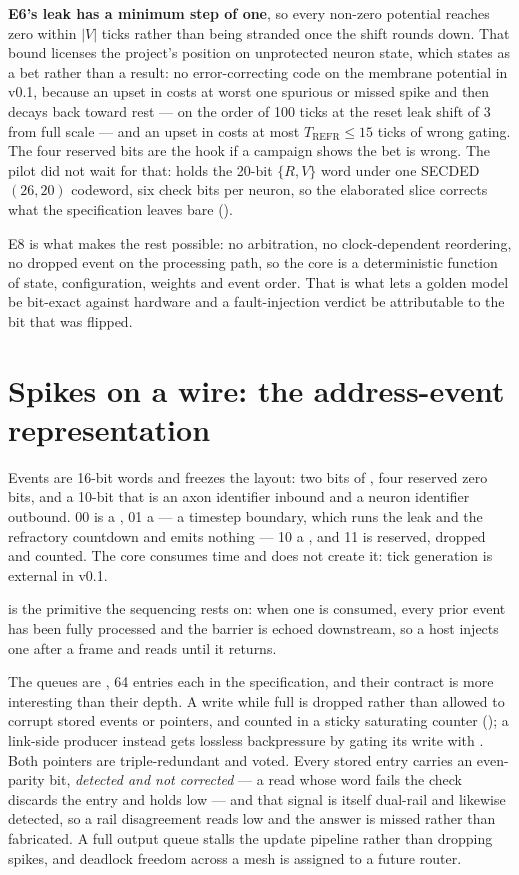 \textbf{E6's leak has a minimum step of one}, so every non-zero
potential reaches zero within $|V|$ ticks rather than being stranded
once the shift rounds down. That bound licenses the project's position
on unprotected neuron state, which  states as a
bet rather than a result: no error-correcting code on the membrane
potential in v0.1, because an upset in  costs at worst one
spurious or missed spike and then decays back toward rest --- on the
order of 100 ticks at the reset leak shift of 3 from full scale --- and
an upset in  costs at most $T_{\mathrm{REFR}} \leq 15$ ticks of
wrong gating. The four reserved bits are the hook if a campaign shows
the bet is wrong. The pilot did not wait for that: 
holds the 20-bit $\{R,V\}$ word under one SECDED $(26,20)$ codeword, six
check bits per neuron, so the elaborated slice corrects what the
specification leaves bare ().

E8 is what makes the rest possible: no arbitration, no clock-dependent
reordering, no dropped event on the processing path, so the core is a
deterministic function of state, configuration, weights and event
order. That is what lets a golden model be bit-exact against hardware
and a fault-injection verdict be attributable to the bit that was
flipped.

\section{Spikes on a wire: the address-event representation}

Events are 16-bit words and  freezes the layout:
two bits of , four reserved zero bits, and a 10-bit
 that is an axon identifier inbound and a neuron identifier
outbound.  00 is a , 01 a  --- a
timestep boundary, which runs the leak and the refractory countdown and
emits nothing --- 10 a , and 11 is reserved, dropped and
counted. The core consumes time and does not create it: tick generation
is external in v0.1.

 is the primitive the sequencing rests on: when one is
consumed, every prior event has been fully processed and the barrier is
echoed downstream, so a host injects one after a frame and reads until
it returns.

The queues are , 64 entries each in the
specification, and their contract is more interesting than their depth.
A write while full is dropped rather than allowed to corrupt stored
events or pointers, and counted in a sticky saturating counter
(); a link-side producer instead gets lossless
backpressure by gating its write with . Both pointers are
triple-redundant and voted. Every stored entry carries an even-parity
bit, \emph{detected and not corrected} --- a read whose word fails the
check discards the entry and holds  low --- and that
signal is itself dual-rail and likewise detected, so a rail
disagreement reads low and the answer is missed rather than fabricated.
A full output queue stalls the update pipeline rather than dropping
spikes, and deadlock freedom across a mesh is assigned to a future
router.

